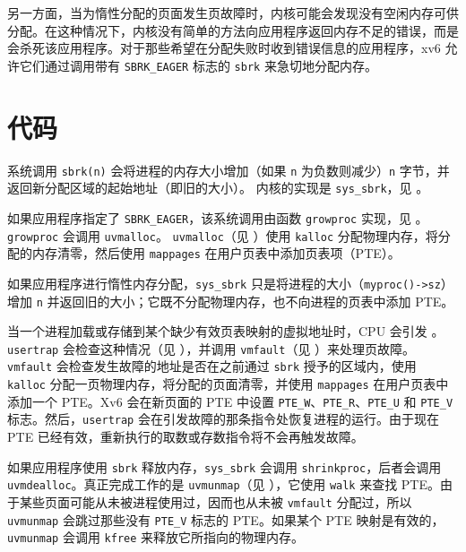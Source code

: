 另一方面，当为惰性分配的页面发生页故障时，内核可能会发现没有空闲内存可供分配。在这种情况下，内核没有简单的方法向应用程序返回内存不足的错误，而是会杀死该应用程序。对于那些希望在分配失败时收到错误信息的应用程序，xv6 允许它们通过调用带有 \lstinline{SBRK_EAGER} 标志的 \lstinline{sbrk} 来急切地分配内存。

\section{代码}

系统调用 {\tt sbrk(n)} 会将进程的内存大小增加（如果 {\tt n} 为负数则减少）{\tt n} 字节，并返回新分配区域的起始地址（即旧的大小）。
内核的实现是 \lstinline{sys_sbrk}，见 。

如果应用程序指定了 \lstinline{SBRK_EAGER}，该系统调用由函数 \lstinline{growproc} 实现，见 。
\lstinline{growproc} 会调用 \lstinline{uvmalloc}。
\lstinline{uvmalloc}（见 ）使用 {\tt kalloc} 分配物理内存，将分配的内存清零，然后使用 {\tt mappages} 在用户页表中添加页表项（PTE）。

如果应用程序进行惰性内存分配，\lstinline{sys_sbrk} 只是将进程的大小（\lstinline{myproc()->sz}）增加 {\tt n} 并返回旧的大小；它既不分配物理内存，也不向进程的页表中添加 PTE。

当一个进程加载或存储到某个缺少有效页表映射的虚拟地址时，CPU 会引发 。
\lstinline{usertrap} 会检查这种情况（见 ），并调用 \lstinline{vmfault}（见 ）来处理页故障。\lstinline{vmfault} 会检查发生故障的地址是否在之前通过 {\tt sbrk} 授予的区域内，使用 {\tt kalloc} 分配一页物理内存，将分配的页面清零，并使用 {\tt mappages} 在用户页表中添加一个 PTE。Xv6 会在新页面的 PTE 中设置 \lstinline{PTE_W}、\lstinline{PTE_R}、\lstinline{PTE_U} 和 \lstinline{PTE_V} 标志。然后，\lstinline{usertrap} 会在引发故障的那条指令处恢复进程的运行。由于现在 PTE 已经有效，重新执行的取数或存数指令将不会再触发故障。

如果应用程序使用 {\tt sbrk} 释放内存，\lstinline{sys_sbrk} 会调用 \lstinline{shrinkproc}，后者会调用 \lstinline{uvmdealloc}。真正完成工作的是 {\tt uvmunmap}（见 ），它使用 {\tt walk} 来查找 PTE。由于某些页面可能从未被进程使用过，因而也从未被 {\tt vmfault} 分配过，所以 {\tt uvmunmap} 会跳过那些没有 \lstinline{PTE_V} 标志的 PTE。如果某个 PTE 映射是有效的，{\tt uvmunmap} 会调用 {\tt kfree} 来释放它所指向的物理内存。

